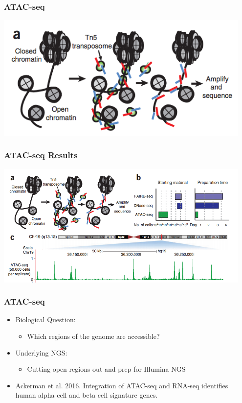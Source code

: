 \documentclass[14pt]{beamer}
\begin{document}
\begin{frame}
\frametitle{ATAC-seq}
\centerline{\includegraphics[width=0.95\textwidth]{images_20170926_ATACsmall.png}}
\end{frame}

\begin{frame}
\frametitle{ATAC-seq Results}
\centerline{\includegraphics[width=0.95\textwidth]{images_20170926_ATAClarge.png}}
\end{frame}

\begin{frame}
\frametitle{ATAC-seq}
\begin{itemize}
	\item<+-> Biological Question:
	\begin{itemize}
		\item<+-> Which regions of the genome are accessible?
	\end{itemize}
	\item<+-> Underlying NGS:
	\begin{itemize}
		\item<+-> Cutting open regions out and prep for Illumina NGS
	\end{itemize}
	\item<+-> Ackerman et al. 2016. Integration of ATAC-seq and RNA-seq identifies human alpha cell and beta cell signature genes.
\end{itemize}
\end{frame}
\end{document}
